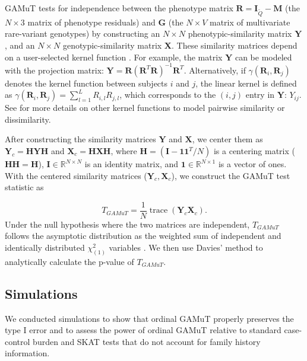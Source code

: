 \documentclass[]{article}
\DeclareMathOperator{\trace}{trace}
\begin{document}
GAMuT tests for independence between the phenotype matrix
\(\mathbf{R}=\mathbf{I}_{\tilde{Q}}-\mathbf{M}\) (the \(N \times 3\)
matrix of phenotype residuals) and \(\mathbf{G}\) (the \(N \times V\)
matrix of multivariate rare-variant genotypes) by constructing an
\(N \times N\) phenotypic-similarity matrix \(\mathbf{Y}\), and an
\(N \times N\) genotypic-similarity matrix \(\mathbf{X}\). These
similarity matrices depend on a user-selected kernel function
\citep{Kwee2008, Schaid2010, Wu2010, Wu2011}. For example, the matrix
\(\mathbf{Y}\) can be modeled with the projection matrix:
\(\mathbf{Y} = \mathbf{R} (\mathbf{R}^T\mathbf{R})^{-1}\mathbf{R}^T\).
Alternatively, if \(\gamma(\mathbf{R}_i,\mathbf{R}_j)\) denotes the
kernel function between subjects \(i\) and \(j\), the linear kernel is
defined as
\(\gamma(\mathbf{R}_i,\mathbf{R}_j)= \sum_{l=1}^L R_{i,l} R_{j,l}\),
which corresponds to the \((i,j)\) entry in \(\mathbf{Y}\): \(Y_{ij}\).
See \citet{Broadaway2016} for more details on other kernel functions to
model pairwise similarity or dissimilarity.

After constructing the similarity matrices \(\mathbf{Y}\) and
\(\mathbf{X}\), we center them as \(\mathbf{Y}_c = \mathbf{HYH}\) and
\(\mathbf{X}_c = \mathbf{HXH}\), where
\(\mathbf{H}=(\mathbf{I}-\mathbf{11}^T/N)\) is a centering matrix
(\(\mathbf{HH} = \mathbf{H}\)),
\(\mathbf{I} \in \mathbb{R}^{N \times N}\) is an identity matrix, and
\(\mathbf{1} \in \mathbb{R}^{N \times 1}\) is a vector of ones. With the
centered similarity matrices (\(\mathbf{Y}_c, \mathbf{X}_c\)), we
construct the GAMuT test statistic as

\[
T_{GAMuT}=\frac{1}{N}\trace(\mathbf{Y}_c\mathbf{X}_c).
\] Under the null hypothesis where the two matrices are independent,
\(T_{GAMuT}\) follows the asymptotic distribution as the weighted sum of
independent and identically distributed \(\chi^2_{(1)}\) variables
\citep{Broadaway2016}. We then use Davies' method \citep{Davies1980} to
analytically calculate the p-value of \(T_{GAMuT}\).

\hypertarget{simulations}{%
\subsection{Simulations}\label{simulations}}

We conducted simulations to show that ordinal GAMuT properly preserves
the type I error and to assess the power of ordinal GAMuT relative to
standard case-control burden \citep{Li2008, Madsen2009} and SKAT
\citep{Wu2011} tests that do not account for family history information.
\end{document}
